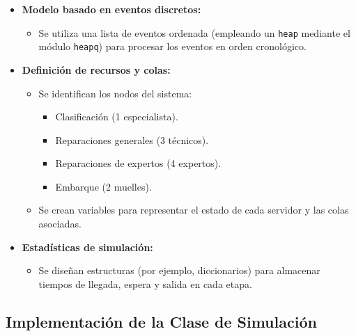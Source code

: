 \documentclass[a4paper,12pt]{article}
\begin{document}
\begin{itemize}[leftmargin=2cm]
    \item \textbf{Modelo basado en eventos discretos:} 
    \begin{itemize}
        \item Se utiliza una lista de eventos ordenada (empleando un \texttt{heap} mediante el módulo \texttt{heapq}) para procesar los eventos en orden cronológico.
    \end{itemize}
    \item \textbf{Definición de recursos y colas:}
    \begin{itemize}
        \item Se identifican los nodos del sistema:
        \begin{itemize}
            \item Clasificación (1 especialista).
            \item Reparaciones generales (3 técnicos).
            \item Reparaciones de expertos (4 expertos).
            \item Embarque (2 muelles).
        \end{itemize}
        \item Se crean variables para representar el estado de cada servidor y las colas asociadas.
    \end{itemize}
    \item \textbf{Estadísticas de simulación:}
    \begin{itemize}
        \item Se diseñan estructuras (por ejemplo, diccionarios) para almacenar tiempos de llegada, espera y salida en cada etapa.
    \end{itemize}
\end{itemize}

\subsection{Implementación de la Clase de Simulación}
\end{document}
